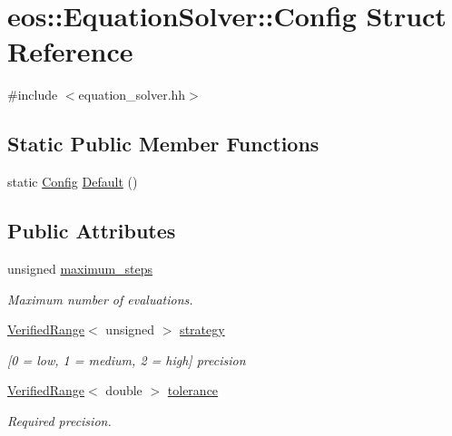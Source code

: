 \hypertarget{structeos_1_1EquationSolver_1_1Config}{
\section{eos::EquationSolver::Config Struct Reference}
\label{structeos_1_1EquationSolver_1_1Config}
}


{\ttfamily \#include $<$equation\_\-solver.hh$>$}\subsection*{Static Public Member Functions}
\begin{DoxyCompactItemize}
\item 
static \hyperlink{structeos_1_1EquationSolver_1_1Config}{Config} \hyperlink{structeos_1_1EquationSolver_1_1Config_a09146644b138f64029be17f8749fc237}{Default} ()
\end{DoxyCompactItemize}
\subsection*{Public Attributes}
\begin{DoxyCompactItemize}
\item 
unsigned \hyperlink{structeos_1_1EquationSolver_1_1Config_ae7c9a2c51f8669b27669cde1a64af2b0}{maximum\_\-steps}
\begin{DoxyCompactList}\small\item\em Maximum number of evaluations. \item\end{DoxyCompactList}\item 
\hyperlink{classeos_1_1VerifiedRange}{VerifiedRange}$<$ unsigned $>$ \hyperlink{structeos_1_1EquationSolver_1_1Config_af745d1f394c65f1176470aa42b1fdbc0}{strategy}
\begin{DoxyCompactList}\small\item\em \mbox{[}0 = low, 1 = medium, 2 = high\mbox{]} precision \item\end{DoxyCompactList}\item 
\hyperlink{classeos_1_1VerifiedRange}{VerifiedRange}$<$ double $>$ \hyperlink{structeos_1_1EquationSolver_1_1Config_a8044943acf44d730c0e78226e1c30492}{tolerance}
\begin{DoxyCompactList}\small\item\em Required precision. \item\end{DoxyCompactList}\end{DoxyCompactItemize}



